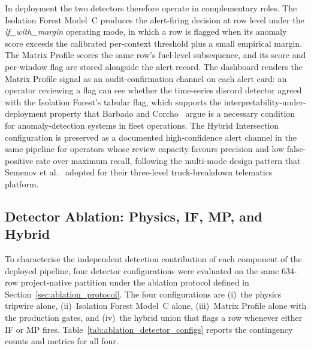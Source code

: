In deployment the two detectors therefore operate in complementary roles. The Isolation Forest Model~C produces the alert-firing decision at row level under the \emph{if\_with\_margin} operating mode, in which a row is flagged when its anomaly score exceeds the calibrated per-context threshold plus a small empirical margin. The Matrix Profile scores the same row's fuel-level subsequence, and its score and per-window flag are stored alongside the alert record. The dashboard renders the Matrix Profile signal as an audit-confirmation channel on each alert card: an operator reviewing a flag can see whether the time-series discord detector agreed with the Isolation Forest's tabular flag, which supports the interpretability-under-deployment property that Barbado and Corcho~\cite{barbado2022interpretable} argue is a necessary condition for anomaly-detection systems in fleet operations. The Hybrid Intersection configuration is preserved as a documented high-confidence alert channel in the same pipeline for operators whose review capacity favours precision and low false-positive rate over maximum recall, following the multi-mode design pattern that Semenov et al.~\cite{semenov2024concept} adopted for their three-level truck-breakdown telematics platform.

\FloatBarrier

\subsection{Detector Ablation: Physics, IF, MP, and Hybrid}
\label{sec:so4_ablation}

To characterise the independent detection contribution of each component of the deployed pipeline, four detector configurations were evaluated on the same 634-row project-native partition under the ablation protocol defined in Section~\ref{sec:ablation_protocol}. The four configurations are (i)~the physics tripwire alone, (ii)~Isolation Forest Model~C alone, (iii)~Matrix Profile alone with the production gates, and (iv)~the hybrid union that flags a row whenever either IF or MP fires. Table~\ref{tab:ablation_detector_configs} reports the contingency counts and metrics for all four.

